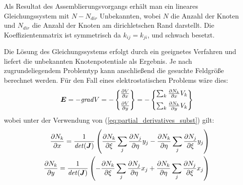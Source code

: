 Als Resultat des Assemblierungsvorgangs erhält man ein lineares Gleichungssystem mit $N - N_{dir}$ Unbekannten, wobei $N$ die Anzahl der Knoten und $N_{dir}$ die Anzahl der Knoten am dirichletschen Rand darstellt. Die Koeffizientenmatrix ist symmetrisch da $k_{ij} = k_{ji}$, und schwach besetzt.
\newline

Die Lösung des Gleichungssystems erfolgt durch ein geeignetes Verfahren und liefert die unbekannten Knotenpotentiale als Ergebnis. Je nach zugrundeliegendem Problemtyp kann anschließend die gesuchte Feldgröße berechnet werden. Für den Fall eines elektrostatischen Problems wäre dies: 
\begin{equation}
\vec{E} = -\mathit{grad}V = 
-\begin{Bmatrix}
\parDiff{V}{x} \\[2mm]
\parDiff{V}{y}
\end{Bmatrix} = 
%
-\begin{Bmatrix}
\sum_{k} \parDiff{N_k}{x} V_k\\[2mm]
\sum_{k} \parDiff{N_k}{y} V_k
\end{Bmatrix}
\end{equation}
wobei unter der Verwendung von (\ref{eq:partial_derivatives_subst}) gilt:
\begin{align*}
\frac{\partial N_k}{\partial x} = \frac{1}{\mathit{det}(\boldsymbol{J})} \left( \frac{\partial N_k}{\partial \xi} \sum_{j} \frac{\partial N_j}{\partial \eta} y_j - \frac{\partial N_k}{\partial \eta} \sum_{j} \frac{\partial N_j}{\partial \xi} y_j \right) \\
\frac{\partial N_k}{\partial y} = \frac{1}{\mathit{det}(\boldsymbol{J})} \left( -\frac{\partial N_k}{\partial \xi} \sum_{j} \frac{\partial N_j}{\partial \eta} x_j + \frac{\partial N_k}{\partial \eta} \sum_{j} \frac{\partial N_j}{\partial \xi} x_j \right) \\
\end{align*}

